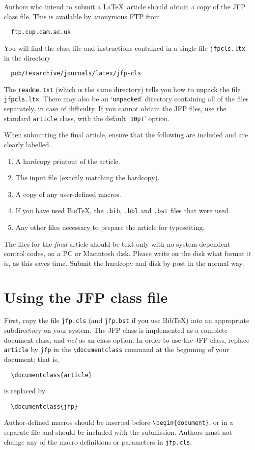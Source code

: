 \documentclass{jfp}
\begin{document}
Authors who intend to submit a \LaTeX\ article should obtain a copy of the
JFP class file. This is available by anonymous FTP from
%
\begin{verbatim}
  ftp.cup.cam.ac.uk
\end{verbatim}
%
You will find the class file and instructions contained in a
single file \verb"jfpcls.ltx" in the directory
%
\begin{verbatim}
  pub/texarchive/journals/latex/jfp-cls
\end{verbatim}
%
The \verb"readme.txt" (which is the same directory) tells you how to
unpack the file \verb"jfpcls.ltx".
There may also be an `\verb"unpacked"' directory containing all of the files
separately, in case of difficulty. If you cannot obtain the JFP files,
use the standard \verb"article" class, with the default `\verb"10pt"' option.

When submitting the final article, ensure that  the following are included and
are clearly labelled.
\begin{enumerate}
  \item A hardcopy printout of the article.
  \item The input file (exactly matching the hardcopy).
  \item A copy of any user-defined macros.
  \item If you have used \textsc{Bib}\TeX, the \verb".bib", \verb".bbl"
        and \verb".bst" files that were used.
  \item Any other files necessary to prepare the article for typesetting.
\end{enumerate}
The files for the \emph{final} article should be text-only with no
system-dependent control codes, on a PC or Macintosh disk.
Please write on the disk what format it is, as this saves time.
Submit the hardcopy and disk by post in the normal way.

\section{Using the JFP class file}
\label{usingjfpclass}

First, copy the file \verb"jfp.cls" (and \verb"jfp.bst" if you use Bib\TeX)
into an appropriate subdirectory on your system. The JFP class is implemented
as a complete document class, and \emph{not} as an class option.
In order to use the JFP class, replace \verb"article" by \verb"jfp" in the
\verb"\documentclass" command at the beginning of your document: that is,
%
\begin{verbatim}
  \documentclass{article}
\end{verbatim}
%
is replaced by
%
\begin{verbatim}
  \documentclass{jfp}
\end{verbatim}
%
Author-defined macros should be inserted before \verb"\begin{document}",
or in a separate file and should be included with the submission.
Authors must not change any of the macro definitions or parameters
in \verb"jfp.cls".
\end{document}
